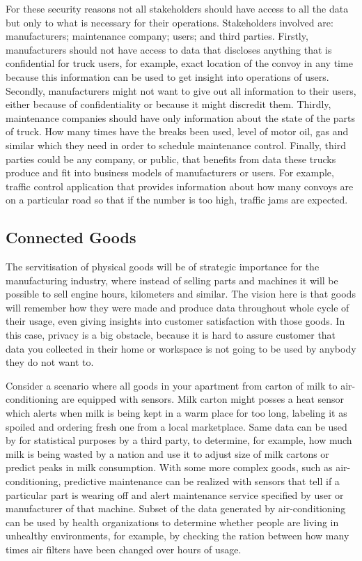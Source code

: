 For these security reasons not all stakeholders should have access to all the data but only to what is necessary for their operations. Stakeholders involved are: manufacturers; maintenance company; users; and third parties. Firstly, manufacturers should not have access to data that discloses anything that is confidential for truck users, for example, exact location of the convoy in any time because this information can be used to get insight into operations of users. Secondly, manufacturers might not want to give out all information to their users, either because of confidentiality or because it might discredit them. Thirdly, maintenance companies should have only information about the state of the parts of truck. How many times have the breaks been used, level of motor oil, gas and similar which they need in order to schedule maintenance control. Finally, third parties could be any company, or public, that benefits from data these trucks produce and fit into business models of manufacturers or users. For example, traffic control application that provides information about how many convoys are on a particular road so that if the number is too high, traffic jams are expected.

\subsection{Connected Goods}

The  servitisation  of  physical  goods  will  be  of  strategic  importance  for the  manufacturing  industry, where instead of selling parts and machines it will be possible to sell engine hours, kilometers and similar. The vision here is that goods will remember how they were made and produce data throughout whole cycle of their usage, even giving insights into customer satisfaction with those goods. In this case, privacy is a big obstacle, because it is hard to assure customer that data you collected in their home or workspace is not going to be used by anybody they do not want to.

Consider a scenario where all goods in your apartment from carton of milk to air-conditioning are equipped with sensors. Milk carton might posses a heat sensor which alerts when milk is being kept in a warm place for too long, labeling it as spoiled and ordering fresh one from a local marketplace. Same data can be used by for statistical purposes by a third party, to determine, for example, how much milk is being wasted by a nation and use it to adjust size of milk cartons or predict peaks in milk consumption. With some more complex goods, such as air-conditioning, predictive maintenance can be realized with sensors that tell if a particular part is wearing off and alert maintenance service specified by user or manufacturer of that machine. Subset of the data generated by air-conditioning can be used by health organizations to determine whether people are living in unhealthy environments, for example, by checking the ration between how many times air filters have been changed over hours of usage.

